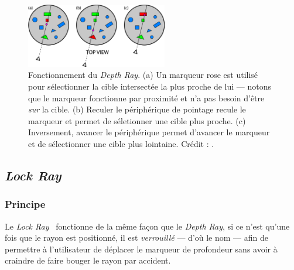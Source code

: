 	\newcommand{\rayWidth}{0.55\textwidth}
	\begin{figure}[!htb]
		\centering
		\includegraphics[width=\rayWidth]{figures/ch2/depthRay}
		\caption[Principe du \emph{Depth Ray}]{Fonctionnement du \emph{Depth Ray}. (a) Un marqueur rose est utilisé pour sélectionner la cible intersectée la plus proche de lui --- notons que le marqueur fonctionne par proximité et n'a pas besoin d'être \emph{sur} la cible. (b) Reculer le périphérique de pointage recule le marqueur et permet de séletionner une cible plus proche. (c) Inversement, avancer le périphérique permet d'avancer le marqueur et de sélectionner une cible plus lointaine. Crédit : \cite{grossman2006design}.}
		\label{fig:depthRay}
	\end{figure}
	
	\subsection{\emph{Lock Ray}}
	\subsubsection{Principe}
	Le \emph{Lock Ray}~\cite{grossman2006design} fonctionne de la même façon que le \emph{Depth Ray}, si ce n'est qu'une fois que le rayon est positionné, il est \emph{verrouillé} --- d'où le nom --- afin de permettre à l'utilisateur de déplacer le marqueur de profondeur sans avoir à craindre de faire bouger le rayon par accident.
	

